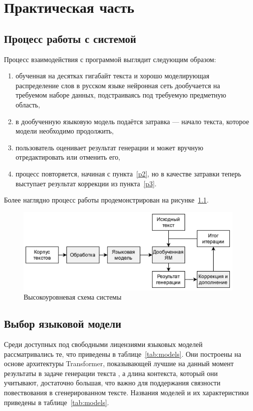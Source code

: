 \chapter{Практическая часть}

\section{Процесс работы с системой}

Процесс взаимодействия с программой выглядит следующим образом:
\begin{enumerate}
    \item обученная на десятках гигабайт текста и хорошо моделирующая распределение слов в русском языке нейронная сеть дообучается на требуемом наборе данных, подстраиваясь под требуемую предметную область,
    \item \label{p2} в дообученную языковую модель подаётся затравка --- начало текста, которое модели необходимо продолжить,
    \item \label{p3} пользователь оценивает результат генерации и может вручную отредактировать или отменить его,
    \item процесс повторяется, начиная с пункта \ref*{p2}, но в качестве затравки теперь выступает результат коррекции из пункта \ref*{p3}.
\end{enumerate}

Более наглядно процесс работы продемонстрирован на рисунке \ref*{fig:pipeline}.

\begin{figure}
    \centering
    \includegraphics[width=\textwidth]{../inc/images/pipeline.png}
    \caption{Высокоуровневая схема системы}
    \label{fig:pipeline}
\end{figure}

\section{Выбор языковой модели}

Среди доступных под свободными лицензиями языковых моделей рассматривались те, что приведены в таблице \ref*{tab:models}. Они построены на основе архитектуры Transformer, показывающей лучшие на данный момент результаты в задаче генерации текста \cite{art:models_review}, а длина контекста, который они учитывают, достаточно большая, что важно для поддержания связности повествования в сгенерированном тексте. Названия моделей и их характеристики приведены в таблице \ref*{tab:models}.

